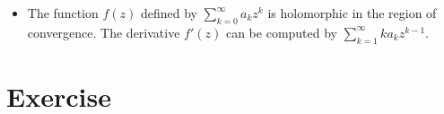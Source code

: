 \begin{itemize}

\item The function $f(z)$ defined by $ \sum_{k=0}^\infty a_kz^k$ is holomorphic in the region of convergence. The derivative $f'(z)$ can be computed by $\sum_{k=1}^\infty k a_k z^{k-1}$.



%
\end{itemize}


\section*{Exercise}

